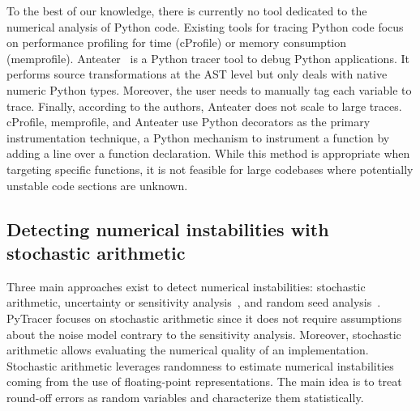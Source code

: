 \documentclass[11pt]{article}
\newcommand{\tristan}[1]{\color{orange}\textbf{From Tristan:} #1\color{black}\xspace}
\newcommand{\pytracer}[0]{PyTracer\xspace}
\begin{document}
To the best of our knowledge, there is currently no tool dedicated to the numerical analysis of Python code. Existing tools for tracing Python code focus on  performance profiling for time (cProfile) 
or memory consumption (memprofile). 
Anteater~\cite{faust2019anteater} is a Python tracer tool to debug Python applications. 
It performs source transformations at the AST level but only deals with native numeric Python types.
Moreover, the user needs to manually tag each variable to trace. Finally, according to the authors, Anteater does not scale to large traces.
cProfile, memprofile, and Anteater use Python decorators as the primary instrumentation technique, a Python mechanism to instrument a function by adding a line over a function declaration.
While this method is appropriate when targeting specific functions, it is not feasible for large codebases where potentially unstable code sections are unknown.


\label{sec:detecting-instabilities}
\subsection{Detecting numerical instabilities with stochastic arithmetic}
\label{sec:mca}

 




Three main approaches exist to detect numerical instabilities: stochastic arithmetic, uncertainty or sensitivity analysis~\cite{helton2006survey}, and random seed analysis~\cite{click2011quality}.
\pytracer focuses on stochastic arithmetic since it does not require assumptions about 
the noise model contrary to the sensitivity analysis.
Moreover, stochastic arithmetic allows evaluating the numerical quality of an implementation.
Stochastic arithmetic leverages randomness to estimate numerical instabilities coming from the use of floating-point representations. The main idea is to treat round-off errors 
as random variables and characterize them statistically.
\end{document}
